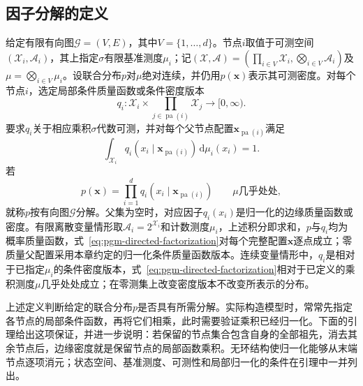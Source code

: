 \subsection{因子分解的定义}
\label{sec:pgm-directed-factor-definition}

\begin{definition}[按有向图分解]
  \label{def:pgm-directed-factorization}
  给定有限有向图$\mathcal{G}=(V,E)$，其中$V=\{1,\ldots,d\}$。节点$i$取值于可测空间$(\mathcal{X}_i,\mathcal{A}_i)$，其上指定$\sigma$有限基准测度$\mu_i$；记$(\mathcal{X},\mathcal{A})=(\prod_{i\in V}\mathcal{X}_i,\bigotimes_{i\in V}\mathcal{A}_i)$及$\mu=\bigotimes_{i\in V}\mu_i$。设联合分布$p$对$\mu$绝对连续，并仍用$p(\bm{x})$表示其可测密度。对每个节点$i$，选定局部条件质量函数或条件密度版本
  \[
    q_i:
    \mathcal{X}_i\times
    \prod_{j\in\operatorname{pa}(i)}\mathcal{X}_j
    \longrightarrow[0,\infty).
  \]
  要求$q_i$关于相应乘积$\sigma$代数可测，并对每个父节点配置$\bm{x}_{\operatorname{pa}(i)}$满足
  \[
    \int_{\mathcal{X}_i}
    q_i(x_i\mid\bm{x}_{\operatorname{pa}(i)})\,\mathrm{d}\mu_i(x_i)=1.
  \]
  若
  \begin{equation}
    p(\bm{x})=\prod_{i=1}^{d}
      q_i(x_i\mid\bm{x}_{\operatorname{pa}(i)})
      \qquad\text{$\mu$几乎处处},
    \label{eq:pgm-directed-factorization}
  \end{equation}
  就称$p$按有向图$\mathcal{G}$分解。父集为空时，对应因子$q_i(x_i)$是归一化的边缘质量函数或密度。有限离散变量情形取$\mathcal{A}_i=2^{\mathcal{X}_i}$和计数测度$\mu_i$，上述积分即求和，$p$与$q_i$均为概率质量函数，式~\eqref{eq:pgm-directed-factorization}对每个完整配置$\bm{x}$逐点成立；零质量父配置采用本章约定的归一化条件质量函数版本。连续变量情形中，$q_i$是相对于已指定$\mu_i$的条件密度版本，式~\eqref{eq:pgm-directed-factorization}相对于已定义的乘积测度$\mu$几乎处处成立；在零测集上改变密度版本不改变所表示的分布。
\end{definition}

上述定义判断给定的联合分布$p$是否具有所需分解。实际构造模型时，常常先指定各节点的局部条件函数，再将它们相乘，此时需要验证乘积已经归一化。下面的引理给出这项保证，并进一步说明：若保留的节点集合包含自身的全部祖先，消去其余节点后，边缘密度就是保留节点的局部函数乘积。无环结构使归一化能够从末端节点逐项消元；状态空间、基准测度、可测性和局部归一化的条件在引理中一并列出。


